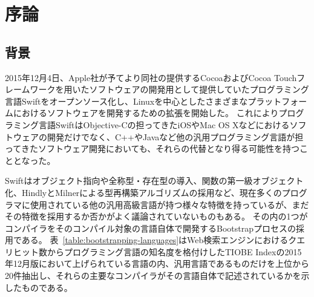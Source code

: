 \chapter{序論}
\label{introduction}

\section{背景}
\label{introduction:background}

2015年12月4日、Apple社が予てより同社の提供するCocoaおよびCocoa Touchフレームワークを用いたソフトウェアの開発用として提供していたプログラミング言語Swiftをオープンソース化し、Linuxを中心としたさまざまなプラットフォームにおけるソフトウェアを開発するための拡張を開始した。
これによりプログラミング言語SwiftはObjective-Cの担ってきたiOSやMac OS Xなどにおけるソフトウェアの開発だけでなく、C++やJavaなど他の汎用プログラミング言語が担ってきたソフトウェア開発においても、それらの代替となり得る可能性を持つこととなった。

Swiftはオブジェクト指向や全称型・存在型の導入、関数の第一級オブジェクト化、HindlyとMilnerによる型再構築アルゴリズムの採用など、現在多くのプログラマに使用されている他の汎用高級言語が持つ様々な特徴を持っているが、まだその特徴を採用するか否かがよく議論されていないものもある。
その内の1つがコンパイラをそのコンパイル対象の言語自体で開発するBootstrapプロセスの採用である。
表~\ref{table:bootstrapping-languages}はWeb検索エンジンにおけるクエリヒット数からプログラミング言語の知名度を格付けしたTIOBE Indexの2015年12月版において上げられている言語の内、汎用言語であるものだけを上位から20件抽出し、それらの主要なコンパイラがその言語自体で記述されているかを示したものである。

%
%
%

